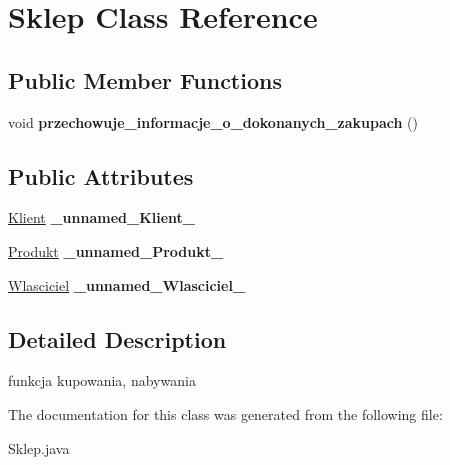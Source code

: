 \hypertarget{class_sklep}{\section{Sklep Class Reference}
\label{class_sklep}
}
\subsection*{Public Member Functions}
\begin{DoxyCompactItemize}
\item 
\hypertarget{class_sklep_a458851513250f2cefa9fa186fc0a90c6}{void {\bfseries przechowuje\+\_\+informacje\+\_\+o\+\_\+dokonanych\+\_\+zakupach} ()}\label{class_sklep_a458851513250f2cefa9fa186fc0a90c6}

\end{DoxyCompactItemize}
\subsection*{Public Attributes}
\begin{DoxyCompactItemize}
\item 
\hypertarget{class_sklep_a1a8cec39ce2a050140c640115c857ffd}{\hyperlink{class_klient}{Klient} {\bfseries \+\_\+unnamed\+\_\+\+Klient\+\_\+}}\label{class_sklep_a1a8cec39ce2a050140c640115c857ffd}

\item 
\hypertarget{class_sklep_aa56f4146758d0df8ff2b35faa0aeb5f3}{\hyperlink{class_produkt}{Produkt} {\bfseries \+\_\+unnamed\+\_\+\+Produkt\+\_\+}}\label{class_sklep_aa56f4146758d0df8ff2b35faa0aeb5f3}

\item 
\hypertarget{class_sklep_aa59791784ff7001b9b912b05906d2bfa}{\hyperlink{class_wlasciciel}{Wlasciciel} {\bfseries \+\_\+unnamed\+\_\+\+Wlasciciel\+\_\+}}\label{class_sklep_aa59791784ff7001b9b912b05906d2bfa}

\end{DoxyCompactItemize}


\subsection{Detailed Description}
funkcja kupowania, nabywania 

The documentation for this class was generated from the following file\+:\begin{DoxyCompactItemize}
\item 
Sklep.\+java\end{DoxyCompactItemize}
